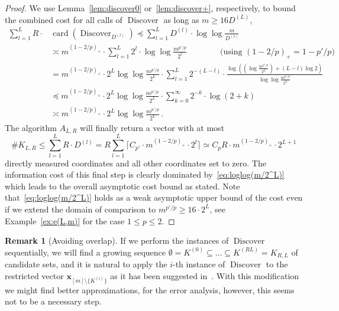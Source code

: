 \documentclass[12pt]{article}
\theoremstyle{plain}
\theoremstyle{definition}
\newtheorem{remark}[theorem]{Remark}
\DeclareMathOperator{\card}{card}
\renewcommand{\vec}{\boldsymbol}
\DeclareMathOperator{\discover}{Discover} %
\begin{document}
\begin{proof}
    We use Lemma~\ref{lem:discover0} or~\ref{lem:discover+}, respectively,
    to bound the combined cost for all calls of $\discover$ as long as $m \geq 16 D^{(L)}$,
    \begin{align}
        \sum_{l=1}^L R \cdot &\card\left(\discover_{D^{(l)}}\right)
            \preceq \sum_{l=1}^L D^{(l)} \cdot \log \log \frac{m}{D^{(l)}} 
                \nonumber \\
            &\asymp m^{(1-2/p)_+} \cdot \sum_{l=1}^L 2^l \cdot \log \log \frac{m^{p'\!/p}}{2^l} 
                \nonumber 
                \qquad\qquad \text{(using $(1-2/p)_+ = 1 - p'\!/p$)}\\
            &= m^{(1-2/p)_+} \cdot 2^L \log \log \frac{m^{p'\!/p}}{2^L} \cdot \sum_{l=1}^L 2^{-(L-l)} \cdot \frac{\log \left(\left(\log \frac{m^{p'\!/p}}{2^L}\right) + (L-l) \log 2\right)}{\log \log \frac{m^{p'\!/p}}{2^L}}
                \nonumber \\
            &\preceq m^{(1-2/p)_+} \cdot 2^L \log \log \frac{m^{p'\!/p}}{2^L}
                \cdot \sum_{k=0}^\infty 2^{-k} \cdot \log(2+k)
                \nonumber \\
            &\asymp m^{(1-2/p)_+} \cdot 2^L \log \log \frac{m^{p'\!/p}}{2^L} \,.
                \label{eq:loglog(m/2^L)}
    \end{align}
    The algorithm $A_{L,R}$ will finally return a vector with at most
    \begin{equation*}
        \# K_{L,R}
            \leq \sum_{l=1}^L R \cdot D^{(l)}
            = R \sum_{l=1}^L \lceil C_{p'} \cdot m^{(1-2/p)_+} \cdot 2^l \rceil
            \simeq C_p R \cdot m^{(1-2/p)_+} \cdot 2^{L+1}
    \end{equation*}
    directly measured coordinates and all other coordinates set to zero.
    The information cost of this final step
    is clearly dominated by~\eqref{eq:loglog(m/2^L)}
    which leads to the overall asymptotic cost bound as stated.
    Note that~\eqref{eq:loglog(m/2^L)} holds as a weak asymptotic upper bound of the cost
    even if we extend the domain of comparison to $m^{p'\!/p} \geq 16 \cdot 2^L$, see Example~\ref{ex:e(L,m)} for the case $1\leq p \leq 2$.
\end{proof}

\begin{remark}[Avoiding overlap]
    If we perform the instances of $\discover$ sequentially,
    we will find a growing sequence
    $\emptyset = K^{(0)} \subseteq \ldots \subseteq K^{(RL)} = K_{R,L}$
    of candidate sets,
    and it is natural to apply the $i$-th instance of $\discover$
    to the restricted vector $\vec{x}_{[m]\setminus\{K^{(i)}\}}$
    as it has been suggested in~\cite{LNW17}.
    With this modification we might find better approximations,
    for the error analysis, however, this seems not to be a necessary step.
\end{remark}
\end{document}
